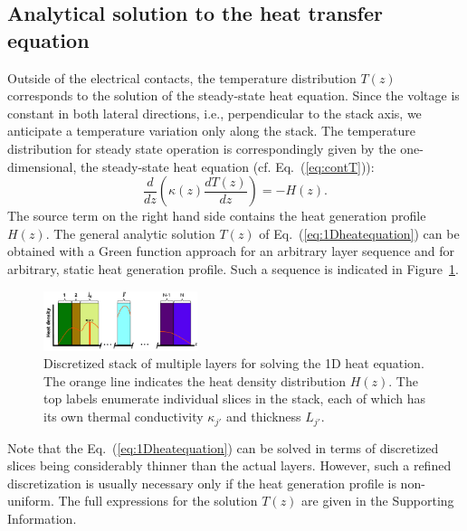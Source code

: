 \documentclass[%
9pt,
 aip,
rsi,%
 amsmath,amssymb,
preprint,%
]{revtex4-1}
\begin{document}
\subsection{Analytical solution to the heat transfer equation}
Outside of the electrical contacts, the temperature distribution $T(z)$ corresponds to the solution of the steady-state heat equation. 
Since the voltage is constant in both lateral directions, i.e., perpendicular to the stack axis, we anticipate a temperature variation only along the stack. The temperature distribution for steady state operation is correspondingly given by the one-dimensional, the steady-state heat equation (cf. Eq.~(\ref{eq:contT})):
\begin{equation}
	\label{eq:1Dheatequation}
    \frac{d}{dz}\left(\kappa(z) \frac{dT(z)}{dz}\right) = -H(z).
\end{equation}
The source term on the right hand side contains the heat generation profile $H(z)$.
The general analytic solution $T(z)$ of Eq.~(\ref{eq:1Dheatequation}) can be obtained with a Green function approach for an arbitrary layer sequence and for arbitrary, static heat generation profile. 
Such a sequence is indicated in Figure~\ref{fig:MultiLayersSetup}.
\begin{figure}
	\centering
	\includegraphics[width=0.4\textwidth]{General_plots_3.pdf}
	\caption{Discretized stack of multiple layers for solving the 1D heat equation. The orange line indicates the heat density distribution $H(z)$. The top labels enumerate individual slices in the stack, each of which has its own thermal conductivity $\kappa_{j'}$ and thickness $L_{j'}$. }
	\label{fig:MultiLayersSetup}
\end{figure}
Note that the Eq.~(\ref{eq:1Dheatequation}) can be solved in terms of discretized slices being considerably thinner than the actual layers. However, such a refined discretization is usually necessary only if the heat generation profile is non-uniform.
The full expressions for the solution $T(z)$ are given in the Supporting Information. 
\end{document}
